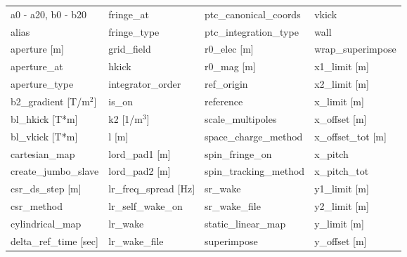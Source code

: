  \begin{tabular}{llll} \toprule
a0 - a20, b0 - b20               & fringe_at                        & ptc_canonical_coords             & vkick                            \\
alias                            & fringe_type                      & ptc_integration_type             & wall                             \\
aperture [m]                     & grid_field                       & r0_elec [m]                      & wrap_superimpose                 \\
aperture_at                      & hkick                            & r0_mag [m]                       & x1_limit [m]                     \\
aperture_type                    & integrator_order                 & ref_origin                       & x2_limit [m]                     \\
b2_gradient [T/m$^2$]            & is_on                            & reference                        & x_limit [m]                      \\
bl_hkick [T*m]                   & k2 [1/m$^3$]                     & scale_multipoles                 & x_offset [m]                     \\
bl_vkick [T*m]                   & l [m]                            & space_charge_method              & x_offset_tot [m]                 \\
cartesian_map                    & lord_pad1 [m]                    & spin_fringe_on                   & x_pitch                          \\
create_jumbo_slave               & lord_pad2 [m]                    & spin_tracking_method             & x_pitch_tot                      \\
csr_ds_step [m]                  & lr_freq_spread [Hz]              & sr_wake                          & y1_limit [m]                     \\
csr_method                       & lr_self_wake_on                  & sr_wake_file                     & y2_limit [m]                     \\
cylindrical_map                  & lr_wake                          & static_linear_map                & y_limit [m]                      \\
delta_ref_time [sec]             & lr_wake_file                     & superimpose                      & y_offset [m]                     \\

\end{tabular}
